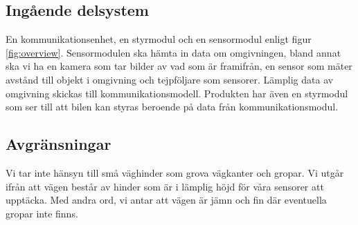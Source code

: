 \documentclass[kravspec/krav.tex]{subfiles}
\begin{document}
\subsection{Ingående delsystem}
En kommunikationsenhet, en styrmodul och en sensormodul enligt figur
\ref{fig:overview}. Sensormodulen ska hämta in data om omgivningen, bland annat
ska vi ha en kamera som tar bilder av vad som är framifrån, en sensor som mäter
avstånd till objekt i omgivning och tejpföljare som sensorer. Lämplig data av
omgivning skickas till kommunikationsmodell. Produkten har även en styrmodul
som ser till att bilen kan styras beroende på data från kommunikationsmodul.

\subsection{Avgränsningar}
Vi tar inte hänsyn till små väghinder som grova vägkanter och gropar.  Vi utgår
ifrån att vägen består av hinder som är i lämplig höjd för våra sensorer att
upptäcka. Med andra ord, vi antar att vägen är jämn och fin där eventuella
gropar inte finns.
\end{document}
